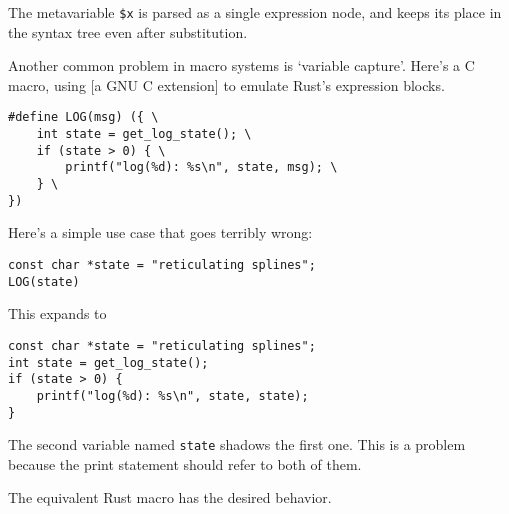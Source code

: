 \documentclass[a4paper,]{book}
\newenvironment{Shaded}{\begin{snugshade}}{\end{snugshade}}
\newcommand{\KeywordTok}[1]{\textcolor[rgb]{0.13,0.29,0.53}{\textbf{{#1}}}}
\newcommand{\DataTypeTok}[1]{\textcolor[rgb]{0.13,0.29,0.53}{{#1}}}
\newcommand{\DecValTok}[1]{\textcolor[rgb]{0.00,0.00,0.81}{{#1}}}
\newcommand{\StringTok}[1]{\textcolor[rgb]{0.31,0.60,0.02}{{#1}}}
\newcommand{\PreprocessorTok}[1]{\textcolor[rgb]{0.56,0.35,0.01}{\textit{{#1}}}}
\newcommand{\NormalTok}[1]{{#1}}
\begin{document}
\begin{Shaded}
\end{Shaded}

The metavariable \texttt{\$x} is parsed as a single expression node, and
keeps its place in the syntax tree even after substitution.

Another common problem in macro systems is `variable capture'. Here's a
C macro, using {[}a GNU C extension{]} to emulate Rust's expression
blocks.

\begin{verbatim}
#define LOG(msg) ({ \
    int state = get_log_state(); \
    if (state > 0) { \
        printf("log(%d): %s\n", state, msg); \
    } \
})
\end{verbatim}

Here's a simple use case that goes terribly wrong:

\begin{verbatim}
const char *state = "reticulating splines";
LOG(state)
\end{verbatim}

This expands to

\begin{verbatim}
const char *state = "reticulating splines";
int state = get_log_state();
if (state > 0) {
    printf("log(%d): %s\n", state, state);
}
\end{verbatim}

The second variable named \texttt{state} shadows the first one. This is
a problem because the print statement should refer to both of them.

The equivalent Rust macro has the desired behavior.

\begin{Shaded}
\end{Shaded}
\end{document}
